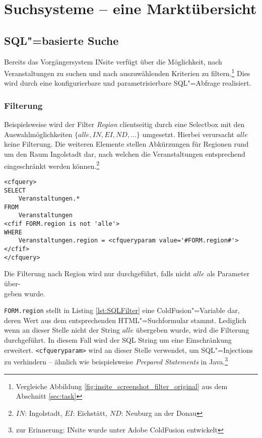 \chapter{Suchsysteme -- eine Marktübersicht}
\label{ch:market}

\section{SQL"=basierte Suche}

Bereits das Vorgängersystem INsite verfügt über die Möglichkeit, nach Veranstaltungen zu suchen und nach auszuwählenden Kriterien zu filtern.\footnote{Vergleiche Abbildung \ref{fig:insite_screenshot_filter_original} aus dem Abschnitt \ref{sec:task}} Dies wird durch eine konfigurierbare und parametrisierbare SQL"=Abfrage realisiert.

\subsection{Filterung}

Beispielsweise wird der Filter \emph{Region} clientseitig durch eine Selectbox mit den Auswahlmöglichkeiten $\{alle, IN, EI, ND, ... \}$ umgesetzt. Hierbei verursacht $alle$ keine Filterung. Die weiteren Elemente stellen Abkürzungen für Regionen rund um den Raum Ingolstadt dar, nach welchen die Veranstaltungen entsprechend eingeschränkt werden können.\footnote{$IN$: Ingolstadt, $EI$: Eichstätt, $ND$: Neuburg an der Donau}

\begin{listing}[ht!]
\begin{margincap}
\begin{verbatim}
<cfquery>
SELECT
	Veranstaltungen.*
FROM
	Veranstaltungen
<cfif FORM.region is not 'alle'>
WHERE
	Veranstaltungen.region = <cfqueryparam value='#FORM.region#'>
</cfif>
</cfquery>
\end{verbatim}
\caption[Filterung nach Region]{Die Filterung nach Region wird nur durchgeführt, falls nicht $alle$ als Parameter über-\\geben wurde. }
\label{lst:SQLFilter}
\end{margincap}
\end{listing}

\texttt{FORM.region} stellt in Listing \ref{lst:SQLFilter} eine ColdFusion"=Variable dar, deren Wert aus dem entsprechenden HTML"=Suchformular stammt. Lediglich wenn an dieser Stelle nicht der String $alle$ übergeben wurde, wird die Filterung durchgeführt. In diesem Fall wird der SQL String um eine Einschränkung erweitert. \texttt{<cfqueryparam>} wird an dieser Stelle verwendet, um SQL"=Injections zu verhindern \cite[S. 171f]{Forta.2010} -- ähnlich wie beispielsweise \emph{Prepared Statements} in Java.\footnote{zur Erinnerung: INsite wurde unter Adobe ColdFusion entwickelt}

